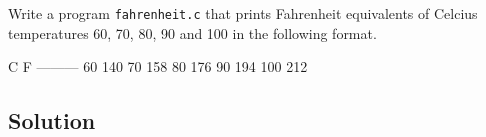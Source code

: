 \documentclass[12pt,letterpaper,twoside]{article}
\begin{document}
Write a program \texttt{fahrenheit.c} that prints Fahrenheit equivalents of Celcius temperatures 60, 70, 80, 90 and 100 in the following format.

\begin{terminal}
 C    F
---------
 60   140
 70   158
 80   176
 90   194
 100  212
\end{terminal}

\subsection*{Solution}

\lstset{language=c,tabsize=4}

\end{document}
